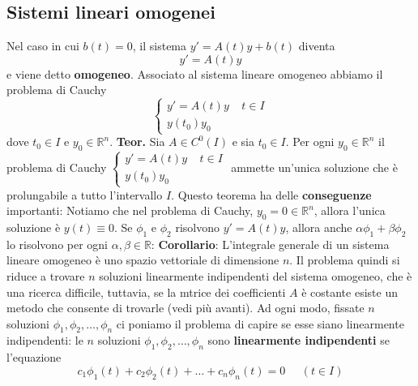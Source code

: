 \subsection{Sistemi lineari omogenei}
Nel caso in cui $b(t) = 0$, il sistema $y' = A(t) y + b(t)$ diventa
\[
    y' = A(t) y
\]
e viene detto \textbf{omogeneo}.\newline
Associato al sistema lineare omogeneo abbiamo il problema di Cauchy
\[
    \begin{cases}
        y' = A(t) y \;\;\;\; t \in I\\
        y(t_0) y_0
    \end{cases}
\]
dove $t_0 \in I$ e $y_0 \in \mathbb{R}^n$.\newline
\newline
\textbf{Teor.} Sia $A \in C^0(I)$ e sia $t_0 \in I$. Per ogni $y_0 \in \mathbb{R}^n$ il problema di Cauchy $\begin{cases}
    y' = A(t) y \;\;\;\; t \in I\\
    y(t_0) y_0
\end{cases}$ ammette un'unica soluzione che è prolungabile a tutto l'intervallo $I$.\newline
\newline
Questo teorema ha delle \textbf{conseguenze} importanti:\newline
Notiamo che nel problema di Cauchy, $y_0 = 0 \in \mathbb{R}^n$, allora l'unica soluzione è $y(t) \equiv 0$.\newline
\newline
Se $\phi_1$ e $\phi_2$ risolvono $y' = A(t) y$, allora anche $\alpha \phi_1 + \beta \phi_2$ lo risolvono per ogni $\alpha, \beta \in \mathbb{R}$:\newline
\textbf{Corollario}: L'integrale generale di un sistema lineare omogeneo è uno spazio vettoriale di dimensione $n$.\newline
\newline
Il problema quindi si riduce a trovare $n$ soluzioni linearmente indipendenti del sistema omogeneo, che è una ricerca difficile, tuttavia, se  la mtrice dei coefficienti $A$ è costante esiste un metodo che consente di trovarle (vedi più avanti).\newline
Ad ogni modo, fissate $n$ soluzioni $\phi_1, \phi_2, \dots, \phi_n$ ci poniamo il problema di capire se esse siano linearmente indipendenti: le $n$ soluzioni $\phi_1, \phi_2, \dots, \phi_n$ sono \textbf{linearmente indipendenti} se l'equazione 
\[
    c_1 \phi_1(t) + c_2 \phi_2(t) + \dots + c_n \phi_n (t) = 0 \;\;\;\;\; (t \in I)
\]
